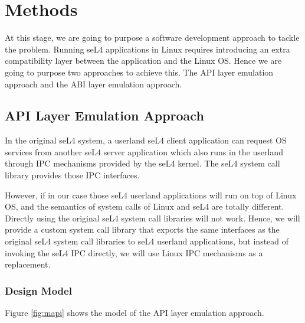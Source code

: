 \chapter{Methods}\label{ch:methods}

At this stage, we are going to purpose a software development approach to tackle the problem. Running seL4 applications in Linux requires introducing an extra compatibility layer between the application and the Linux OS. Hence we are going to purpose two approaches to achieve this. The API layer emulation approach and the ABI layer emulation approach.  

\section{API Layer Emulation Approach}

In the original seL4 system, a userland seL4 client application can request OS services from another seL4 server application which also runs in the userland through IPC mechanisms provided by the seL4 kernel. The seL4 system call library provides those IPC interfaces. 

However, if in our case those seL4 userland applications will run on top of Linux OS, and the semantics of system calls of Linux and seL4 are totally different. Directly using the original seL4 system call libraries will not work. Hence, we will provide a custom system call library that exports the same interfaces as the original seL4 system call libraries to seL4 userland applications, but instead of invoking the seL4 IPC directly, we will use Linux IPC mechanisms as a replacement.

\subsection{ Design Model}

Figure \ref{fig:mapi} shows the model of the API layer emulation approach. 

